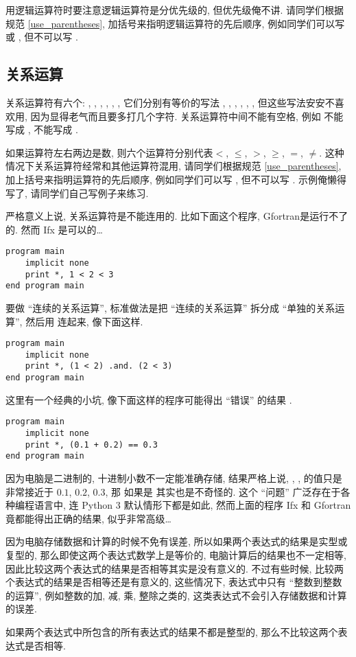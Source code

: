 用逻辑运算符时要注意逻辑运算符是分优先级的, 但优先级俺不讲. 请同学们根据规范 \ref{use_parentheses}, 加括号来指明逻辑运算符的先后顺序, 例如同学们可以写  或 , 但不可以写 .

\subsection{关系运算}

关系运算符有六个: \ttt{<}, \ttt{<=}, \ttt{>}, \ttt{>=}, \ttt{==}, \ttt{/=}, 它们分别有等价的写法 , , , , , , 但这些写法安安不喜欢用, 因为显得老气而且要多打几个字符. 关系运算符中间不能有空格, 例如 \ttt{==} 不能写成 \ttt{= =},  不能写成 .

如果运算符左右两边是数, 则六个运算符分别代表$<$, $\leqslant$, $>$, $\geqslant$, $=$, $\neq$. 这种情况下关系运算符经常和其他运算符混用, 请同学们根据规范 \ref{use_parentheses}, 加上括号来指明运算符的先后顺序, 例如同学们可以写 , 但不可以写 . 示例俺懒得写了, 请同学们自己写例子来练习.

严格意义上说, 关系运算符是不能连用的. 比如下面这个程序, Gfortran是运行不了的. 然而 Ifx 是可以的\dots{}
\begin{lstlisting}
program main
    implicit none
    print *, 1 < 2 < 3
end program main
\end{lstlisting}
要做 ``连续的关系运算'', 标准做法是把 ``连续的关系运算'' 拆分成 ``单独的关系运算'', 然后用  连起来, 像下面这样.
\begin{lstlisting}
program main
    implicit none
    print *, (1 < 2) .and. (2 < 3)
end program main
\end{lstlisting}

这里有一个经典的小坑, 像下面这样的程序可能得出 ``错误'' 的结果 .
\begin{lstlisting}
program main
    implicit none
    print *, (0.1 + 0.2) == 0.3
end program main
\end{lstlisting}
因为电脑是二进制的, 十进制小数不一定能准确存储, 结果严格上说, , ,  的值只是非常接近于 $0.1$, $0.2$, $0.3$, 那  如果是  其实也是不奇怪的. 这个 ``问题'' 广泛存在于各种编程语言中, 连 Python 3 默认情形下都是如此, 然而上面的程序 Ifx 和 Gfortran 竟都能得出正确的结果, 似乎非常高级\dots{}

因为电脑存储数据和计算的时候不免有误差, 所以如果两个表达式的结果是实型或复型的, 那么即使这两个表达式数学上是等价的, 电脑计算后的结果也不一定相等, 因此比较这两个表达式的结果是否相等其实是没有意义的. 不过有些时候, 比较两个表达式的结果是否相等还是有意义的, 这些情况下, 表达式中只有 ``整数到整数的运算'', 例如整数的加, 减, 乘, \uline{整}除之类的, 这类表达式不会引入存储数据和计算的误差.
\begin{convention}
    如果两个表达式中所包含的所有表达式的结果不都是整型的, 那么不比较这两个表达式是否相等.
\end{convention}

